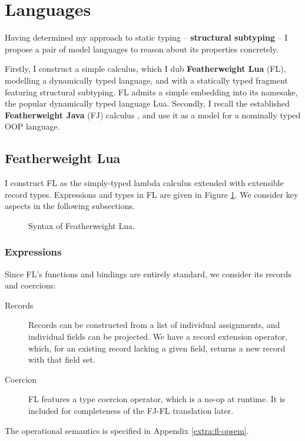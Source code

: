 \section{Languages}
\label{sec:languages}

Having determined my approach to static typing -- \textbf{structural subtyping} -- I propose a pair of model languages to reason about its properties concretely.

Firstly, I construct a simple calculus, which I dub \textbf{Featherweight Lua} (FL), modelling a dynamically typed language, and with a statically typed fragment featuring structural subtyping. FL admits a simple embedding into its namesake, the popular dynamically typed language Lua. Secondly, I recall the established \textbf{Featherweight Java} (FJ) calculus \cite{featherweight-java}, and use it as a model for a nominally typed OOP language.  

\subsection{Featherweight Lua}
\label{subsec:featherweight-lua}

I construct FL as the simply-typed lambda calculus extended with extensible record types. Expressions and types in FL are given in Figure \ref{fig:featherweight-lua-grammar}. We consider key aspects in the following subsections.

\begin{figure}
    \centering
    
    \caption{Syntax of Featherweight Lua.}
    \label{fig:featherweight-lua-grammar}
\end{figure}

\subsubsection{Expressions}

Since FL's functions and bindings are entirely standard, we consider its records and coercions:
\begin{description}
    \item[Records] Records can be constructed from a list of individual assignments, and individual fields can be projected. We have a record extension operator, which, for an existing record lacking a given field, returns a new record with that field set.
    \item[Coercion] FL features a type coercion operator, which is a no-op at runtime. It is included for completeness of the FJ-FL translation later.
\end{description}
The operational semantics is specified in Appendix \ref{extra:fl-opsem}.


